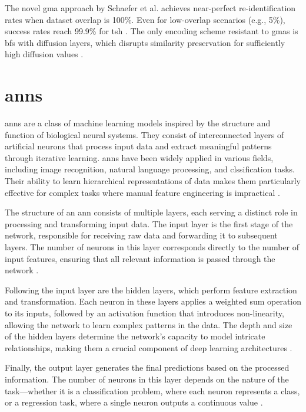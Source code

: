 The novel \ac{gma} approach by Schaefer et al. achieves near-perfect re-identification rates when dataset overlap is 100\%.
Even for low-overlap scenarios (e.g., 5\%), success rates reach 99.9\% for \ac{tsh} \cite{schaefer2024}.
The only encoding scheme resistant to \ac{gma}s is \ac{bf}s with diffusion layers, which disrupts similarity preservation for sufficiently high diffusion values \cite{schaefer2024}.


\section{\ac{ann}s} \label{sec:nn}

\ac{ann}s are a class of machine learning models inspired by the structure and function of biological neural systems.
They consist of interconnected layers of artificial neurons that process input data and extract meaningful patterns through iterative learning.
\ac{ann}s have been widely applied in various fields, including image recognition, natural language processing, and clssification tasks.
Their ability to learn hierarchical representations of data makes them particularly effective for complex tasks where manual feature engineering is impractical \cite{dongare2012introduction}.

The structure of an \ac{ann} consists of multiple layers, each serving a distinct role in processing and transforming input data.
The input layer is the first stage of the network, responsible for receiving raw data and forwarding it to subsequent layers.
The number of neurons in this layer corresponds directly to the number of input features, ensuring that all relevant information is passed through the network \cite{dongare2012introduction}.

Following the input layer are the hidden layers, which perform feature extraction and transformation.
Each neuron in these layers applies a weighted sum operation to its inputs, followed by an activation function that introduces non-linearity, allowing the network to learn complex patterns in the data.
The depth and size of the hidden layers determine the network's capacity to model intricate relationships, making them a crucial component of deep learning architectures \cite{dongare2012introduction}.

Finally, the output layer generates the final predictions based on the processed information.
The number of neurons in this layer depends on the nature of the task—whether it is a classification problem, where each neuron represents a class, or a regression task, where a single neuron outputs a continuous value \cite{dongare2012introduction}.

